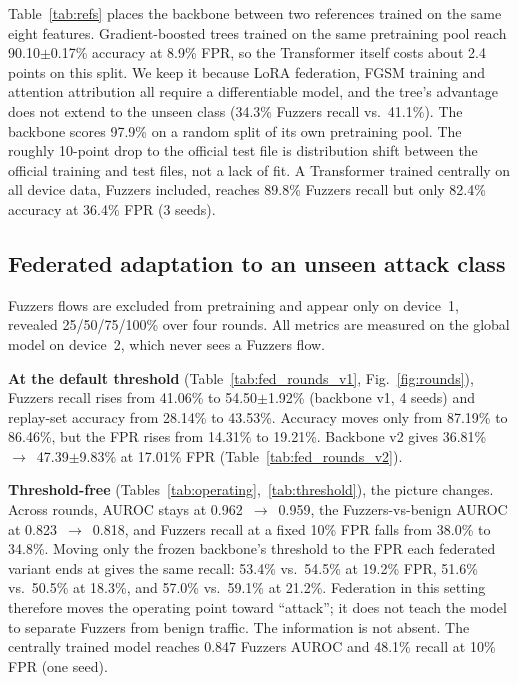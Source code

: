 Table~\ref{tab:refs} places the backbone between two references trained on
the same eight features. Gradient-boosted trees trained on the same
pretraining pool reach 90.10$\pm$0.17\% accuracy at 8.9\% FPR, so the
Transformer itself costs about 2.4 points on this split. We keep it because
LoRA federation, FGSM training and attention attribution all require a
differentiable model, and the tree's advantage does not extend to the unseen
class (34.3\% Fuzzers recall vs.\ 41.1\%). The backbone scores 97.9\% on a
random split of its own pretraining pool. The roughly 10-point drop to the
official test file is distribution shift between the official training and
test files, not a lack of fit. A Transformer trained
centrally on all device data, Fuzzers included, reaches 89.8\% Fuzzers recall
but only 82.4\% accuracy at 36.4\% FPR (3 seeds).

\subsection{Federated adaptation to an unseen attack class}
Fuzzers flows are excluded from pretraining and appear only on device~1,
revealed 25/50/75/100\% over four rounds. All metrics are measured on the
global model on device~2, which never sees a Fuzzers flow.

\textbf{At the default threshold} (Table~\ref{tab:fed_rounds_v1},
Fig.~\ref{fig:rounds}), Fuzzers recall rises from 41.06\% to
54.50$\pm$1.92\% (backbone v1, 4 seeds) and replay-set accuracy from 28.14\% to
43.53\%. Accuracy moves only from 87.19\% to 86.46\%, but the FPR rises from
14.31\% to 19.21\%. Backbone v2 gives 36.81\%~$\rightarrow$~47.39$\pm$9.83\%
at 17.01\% FPR (Table~\ref{tab:fed_rounds_v2}).

\textbf{Threshold-free} (Tables~\ref{tab:operating},~\ref{tab:threshold}), the
picture changes. Across rounds, AUROC stays at 0.962~$\rightarrow$~0.959, the
Fuzzers-vs-benign AUROC at 0.823~$\rightarrow$~0.818, and Fuzzers recall at a
fixed 10\% FPR falls from 38.0\% to 34.8\%. Moving only the frozen backbone's
threshold to the FPR each federated variant ends at gives the same recall:
53.4\% vs.\ 54.5\% at 19.2\% FPR, 51.6\% vs.\ 50.5\% at 18.3\%, and 57.0\% vs.\
59.1\% at 21.2\%. Federation in this setting therefore moves the operating
point toward ``attack''; it does not teach the model to separate Fuzzers from
benign traffic. The information is not absent. The centrally trained model
reaches 0.847 Fuzzers AUROC and 48.1\% recall at 10\% FPR (one seed).

